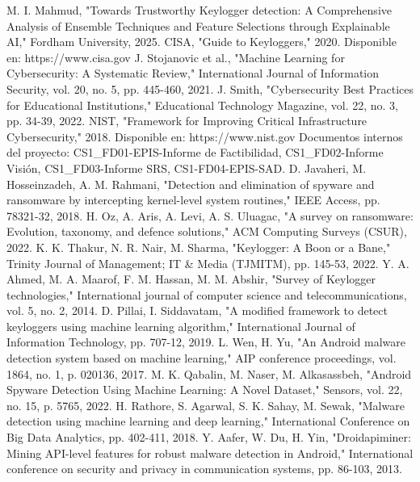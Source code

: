 \documentclass[conference]{IEEEtran}
\begin{document}
\begin{thebibliography}{99}
 M. I. Mahmud, "Towards Trustworthy Keylogger detection: A Comprehensive Analysis of Ensemble Techniques and Feature Selections through Explainable AI," Fordham University, 2025.
 CISA, "Guide to Keyloggers," 2020. Disponible en: https://www.cisa.gov
 J. Stojanovic et al., "Machine Learning for Cybersecurity: A Systematic Review," International Journal of Information Security, vol. 20, no. 5, pp. 445-460, 2021.
 J. Smith, "Cybersecurity Best Practices for Educational Institutions," Educational Technology Magazine, vol. 22, no. 3, pp. 34-39, 2022.
 NIST, "Framework for Improving Critical Infrastructure Cybersecurity," 2018. Disponible en: https://www.nist.gov
 Documentos internos del proyecto: CS1_FD01-EPIS-Informe de Factibilidad, CS1_FD02-Informe Visión, CS1_FD03-Informe SRS, CS1-FD04-EPIS-SAD.
 D. Javaheri, M. Hosseinzadeh, A. M. Rahmani, "Detection and elimination of spyware and ransomware by intercepting kernel-level system routines," IEEE Access, pp. 78321-32, 2018.
 H. Oz, A. Aris, A. Levi, A. S. Uluagac, "A survey on ransomware: Evolution, taxonomy, and defence solutions," ACM Computing Surveys (CSUR), 2022.
 K. K. Thakur, N. R. Nair, M. Sharma, "Keylogger: A Boon or a Bane," Trinity Journal of Management; IT & Media (TJMITM), pp. 145-53, 2022.
 Y. A. Ahmed, M. A. Maarof, F. M. Hassan, M. M. Abshir, "Survey of Keylogger technologies," International journal of computer science and telecommunications, vol. 5, no. 2, 2014.
 D. Pillai, I. Siddavatam, "A modified framework to detect keyloggers using machine learning algorithm," International Journal of Information Technology, pp. 707-12, 2019.
 L. Wen, H. Yu, "An Android malware detection system based on machine learning," AIP conference proceedings, vol. 1864, no. 1, p. 020136, 2017.
 M. K. Qabalin, M. Naser, M. Alkasassbeh, "Android Spyware Detection Using Machine Learning: A Novel Dataset," Sensors, vol. 22, no. 15, p. 5765, 2022.
 H. Rathore, S. Agarwal, S. K. Sahay, M. Sewak, "Malware detection using machine learning and deep learning," International Conference on Big Data Analytics, pp. 402-411, 2018.
 Y. Aafer, W. Du, H. Yin, "Droidapiminer: Mining API-level features for robust malware detection in Android," International conference on security and privacy in communication systems, pp. 86-103, 2013.

\end{thebibliography}
\end{document}
